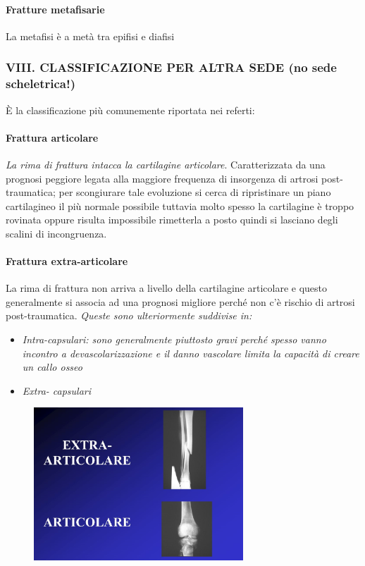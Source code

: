 \paragraph{Fratture metafisarie} 
La metafisi è a metà tra epifisi e diafisi


\subsubsection{VIII. CLASSIFICAZIONE PER ALTRA SEDE (no sede scheletrica!)}

È la classificazione più comunemente riportata nei referti:

\paragraph{Frattura articolare} 
\emph{La rima di frattura intacca la cartilagine articolare}. Caratterizzata da una prognosi peggiore legata alla maggiore frequenza di insorgenza di artrosi post-traumatica; per scongiurare tale evoluzione si cerca di ripristinare un piano cartilagineo il più normale possibile tuttavia molto spesso la cartilagine è troppo rovinata oppure risulta impossibile rimetterla a posto quindi si lasciano degli scalini di incongruenza.
\paragraph{Frattura extra-articolare} 
La rima di frattura non arriva a livello della cartilagine articolare e questo generalmente si associa ad una prognosi migliore perché non c'è rischio di artrosi post-traumatica. \emph{Queste sono ulteriormente suddivise in:}

\begin{itemize}
\item
  \emph{Intra-capsulari: sono generalmente piuttosto gravi perché spesso vanno incontro a devascolarizzazione e il danno vascolare limita la capacità di creare un callo osseo}
\item
  \emph{Extra- capsulari}
\end{itemize}

\begin{figure}[!ht]
\centering
\includegraphics[width=0.7\textwidth]{002/image7.png}
\end{figure}

